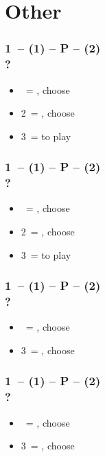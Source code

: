 \section{\texorpdfstring{Other}{otherBidsAndRules}}\label{sec:otherBidsAndRules}

\subsubsection*{1\clubs\ -- (1\hearts) -- P -- (2\hearts) \\ ?}
\begin{itemize}
    \item \dbl\ = \clubs\spades, choose
    \item 2\nt\ = \clubs\diams, choose
    \item 3\clubs\ = to play
\end{itemize}

\subsubsection*{1\clubs\ -- (1\spades) -- P -- (2\spades) \\ ?}
\begin{itemize}
    \item \dbl\ = \clubs\hearts, choose
    \item 2\nt\ = \clubs\diams, choose
    \item 3\clubs\ = to play
\end{itemize}

\subsubsection*{1\diams\ -- (1\spades) -- P -- (2\spades) \\ ?}
\begin{itemize}
    \item \dbl\ = \diams\hearts, choose
    \item 3\clubs\ = \clubs\diams, choose
\end{itemize}

\subsubsection*{1\diams\ -- (1\hearts) -- P -- (2\hearts) \\ ?}
\begin{itemize}
    \item \dbl\ = \diams\spades, choose
    \item 3\clubs\ = \clubs\diams, choose
\end{itemize}


